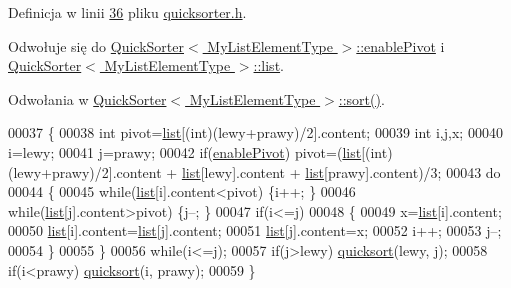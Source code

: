 Definicja w linii \hyperlink{quicksorter_8h_source_l00036}{36} pliku \hyperlink{quicksorter_8h_source}{quicksorter.\-h}.



Odwołuje się do \hyperlink{quicksorter_8h_source_l00022}{Quick\-Sorter$<$ My\-List\-Element\-Type $>$\-::enable\-Pivot} i \hyperlink{quicksorter_8h_source_l00023}{Quick\-Sorter$<$ My\-List\-Element\-Type $>$\-::list}.



Odwołania w \hyperlink{quicksorter_8h_source_l00061}{Quick\-Sorter$<$ My\-List\-Element\-Type $>$\-::sort()}.


\begin{DoxyCode}
00037         \{
00038             \textcolor{keywordtype}{int} pivot=\hyperlink{class_quick_sorter_a60a7a4772c958f256962294418e83fe4}{list}[(int)(lewy+prawy)/2].content;
00039             \textcolor{keywordtype}{int} i,j,x;
00040             i=lewy;
00041             j=prawy;
00042             \textcolor{keywordflow}{if}(\hyperlink{class_quick_sorter_aba28a6d8a0209191c937fc2bf8c83861}{enablePivot}) pivot=(\hyperlink{class_quick_sorter_a60a7a4772c958f256962294418e83fe4}{list}[(int)(lewy+prawy)/2].content + 
      \hyperlink{class_quick_sorter_a60a7a4772c958f256962294418e83fe4}{list}[lewy].content + \hyperlink{class_quick_sorter_a60a7a4772c958f256962294418e83fe4}{list}[prawy].content)/3;
00043             \textcolor{keywordflow}{do}
00044             \{
00045                 \textcolor{keywordflow}{while}(\hyperlink{class_quick_sorter_a60a7a4772c958f256962294418e83fe4}{list}[i].content<pivot) \{i++; \}
00046                 \textcolor{keywordflow}{while}(\hyperlink{class_quick_sorter_a60a7a4772c958f256962294418e83fe4}{list}[j].content>pivot) \{j--; \}
00047                 \textcolor{keywordflow}{if}(i<=j)
00048                 \{
00049                     x=\hyperlink{class_quick_sorter_a60a7a4772c958f256962294418e83fe4}{list}[i].content;
00050                     \hyperlink{class_quick_sorter_a60a7a4772c958f256962294418e83fe4}{list}[i].content=\hyperlink{class_quick_sorter_a60a7a4772c958f256962294418e83fe4}{list}[j].content;
00051                     \hyperlink{class_quick_sorter_a60a7a4772c958f256962294418e83fe4}{list}[j].content=x;
00052                     i++;
00053                     j--;
00054                 \}
00055             \}
00056             \textcolor{keywordflow}{while}(i<=j);
00057             \textcolor{keywordflow}{if}(j>lewy) \hyperlink{class_quick_sorter_aefa16c2996c131443c10183219797632}{quicksort}(lewy, j);
00058             \textcolor{keywordflow}{if}(i<prawy) \hyperlink{class_quick_sorter_aefa16c2996c131443c10183219797632}{quicksort}(i, prawy);
00059         \}
\end{DoxyCode}

